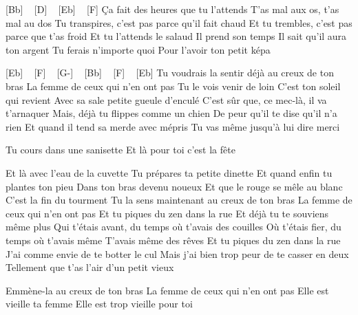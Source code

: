 
[Bb] ~ [D] ~ [Eb] ~ [F]
Ça fait des heures que tu l'attends
T'as mal aux os, t'as mal au dos
Tu transpires, c'est pas parce qu'il fait chaud
Et tu trembles, c'est pas parce que t'as froid
Et tu l'attends le salaud
Il prend son temps
Il sait qu'il aura ton argent
Tu ferais n'importe quoi
Pour l'avoir ton petit képa

[Eb] ~ [F] ~ [G-] ~ [Bb] ~ [F] ~ [Eb]
Tu voudrais la sentir déjà au creux de ton bras
La femme de ceux qui n'en ont pas
Tu le vois venir de loin
C'est ton soleil qui revient
Avec sa sale petite gueule d'enculé
C'est sûr que, ce mec-là, il va t'arnaquer
Mais, déjà tu flippes comme un chien
De peur qu'il te dise qu'il n'a rien
Et quand il tend sa merde avec mépris
Tu vas même jusqu'à lui dire merci

Tu cours dans une sanisette
Et là pour toi c'est la fête

Et là avec l'eau de la cuvette
Tu prépares ta petite dinette
Et quand enfin tu plantes ton pieu
Dans ton bras devenu noueux
Et que le rouge se mêle au blanc
C'est la fin du tourment
Tu la sens maintenant au creux de ton bras
La femme de ceux qui n'en ont pas
Et tu piques du zen dans la rue
Et déjà tu te souviens même plus
Qui t'étais avant, du temps où t'avais des couilles
Où t'étais fier, du temps où t'avais même
T'avais même des rêves
Et tu piques du zen dans la rue
J'ai comme envie de te botter le cul
Mais j'ai bien trop peur de te casser en deux
Tellement que t'as l'air d'un petit vieux

Emmène-la au creux de ton bras
La femme de ceux qui n'en ont pas
Elle est vieille ta femme
Elle est trop vieille pour toi


